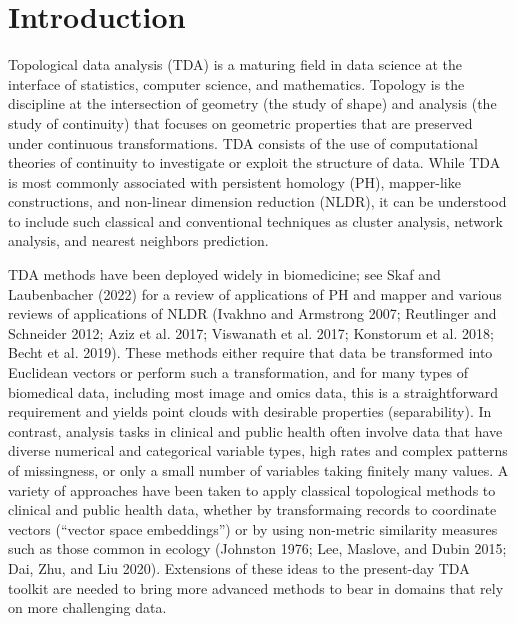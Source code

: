 \documentclass{article}
\begin{document}
\pagebreak

\hypertarget{introduction}{%
\section{Introduction}\label{introduction}}

Topological data analysis (TDA) is a maturing field in data science at
the interface of statistics, computer science, and mathematics. Topology
is the discipline at the intersection of geometry (the study of shape)
and analysis (the study of continuity) that focuses on geometric
properties that are preserved under continuous transformations. TDA
consists of the use of computational theories of continuity to
investigate or exploit the structure of data. While TDA is most commonly
associated with persistent homology (PH), mapper-like constructions, and
non-linear dimension reduction (NLDR), it can be understood to include
such classical and conventional techniques as cluster analysis, network
analysis, and nearest neighbors prediction.

TDA methods have been deployed widely in biomedicine; see Skaf and
Laubenbacher (2022) for a review of applications of PH and mapper and
various reviews of applications of NLDR (Ivakhno and Armstrong 2007;
Reutlinger and Schneider 2012; Aziz et al. 2017; Viswanath et al. 2017;
Konstorum et al. 2018; Becht et al. 2019). These methods either require
that data be transformed into Euclidean vectors or perform such a
transformation, and for many types of biomedical data, including most
image and omics data, this is a straightforward requirement and yields
point clouds with desirable properties (separability). In contrast,
analysis tasks in clinical and public health often involve data that
have diverse numerical and categorical variable types, high rates and
complex patterns of missingness, or only a small number of variables
taking finitely many values. A variety of approaches have been taken to
apply classical topological methods to clinical and public health data,
whether by transformaing records to coordinate vectors (``vector space
embeddings'') or by using non-metric similarity measures such as those
common in ecology (Johnston 1976; Lee, Maslove, and Dubin 2015; Dai,
Zhu, and Liu 2020). Extensions of these ideas to the present-day TDA
toolkit are needed to bring more advanced methods to bear in domains
that rely on more challenging data.
\end{document}
